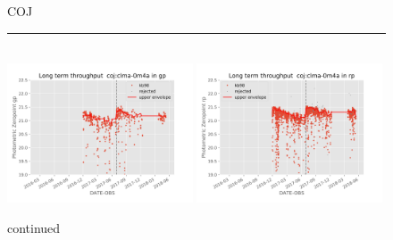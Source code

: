 \documentclass[draft]{spieman}
\begin{document}
\begin{figure}
COJ \\ 
\rule{\textwidth}{0.4pt} \\
\includegraphics[width=0.49\textwidth]{images/photzptrend-coj-clma-0m4a-gp.png} \hspace*{\fill}
\includegraphics[width=0.49\textwidth]{images/photzptrend-coj-clma-0m4a-rp.png} \\[1ex]
\caption {continued}
\end{figure}
\end{document}
